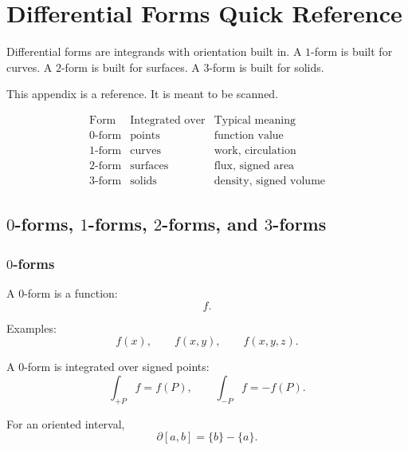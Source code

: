 
\chapter{Differential Forms Quick Reference}
\label{app:differential-forms-reference}

Differential forms are integrands with orientation built in.  A \(1\)-form is built for
curves.  A \(2\)-form is built for surfaces.  A \(3\)-form is built for solids.

This appendix is a reference.  It is meant to be scanned.

\[
\begin{array}{c|c|c}
\text{Form} & \text{Integrated over} & \text{Typical meaning} \\ \hline
0\text{-form} & \text{points} & \text{function value}\\[1mm]
1\text{-form} & \text{curves} & \text{work, circulation}\\[1mm]
2\text{-form} & \text{surfaces} & \text{flux, signed area}\\[1mm]
3\text{-form} & \text{solids} & \text{density, signed volume}
\end{array}
\]

\section{\texorpdfstring{\(0\)}{0}-forms, \texorpdfstring{\(1\)}{1}-forms,
\texorpdfstring{\(2\)}{2}-forms, and \texorpdfstring{\(3\)}{3}-forms}
\label{app:E.1}

\subsection*{\texorpdfstring{\(0\)}{0}-forms}

A \(0\)-form is a function:
\[
\boxed{
    f.
}
\]

Examples:
\[
    f(x),
    \qquad
    f(x,y),
    \qquad
    f(x,y,z).
\]

A \(0\)-form is integrated over signed points:
\[
\boxed{
    \int_{+P}f=f(P),
    \qquad
    \int_{-P}f=-f(P).
}
\]

For an oriented interval,
\[
\boxed{
    \partial[a,b]=\{b\}-\{a\}.
}
\]

